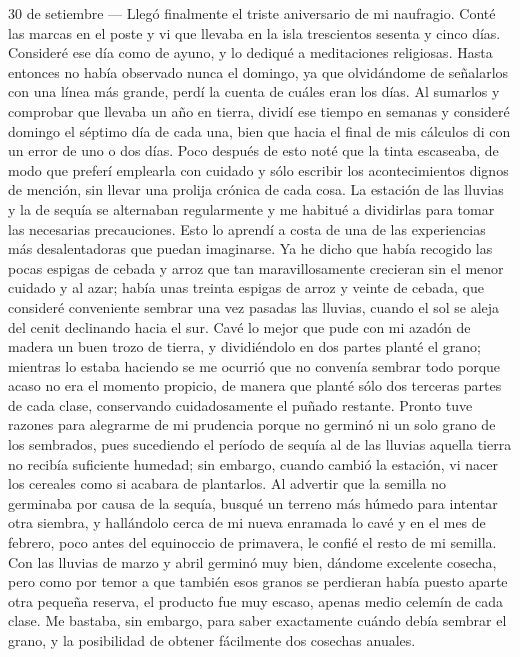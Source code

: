 \documentclass{novela}
\begin{document}
    30 de setiembre — Llegó finalmente el triste aniversario de mi naufragio. Conté las marcas en el poste y vi que llevaba en la isla trescientos sesenta y cinco días. Consideré ese día como de ayuno, y lo dediqué a meditaciones religiosas.
    Hasta entonces no había observado nunca el domingo, ya que olvidándome de señalarlos con una línea más grande, perdí la cuenta de cuáles eran los días.
    Al sumarlos y comprobar que llevaba un año en tierra, dividí ese tiempo en semanas y consideré domingo el séptimo día de cada una, bien que hacia el final de mis cálculos di con un error de uno o dos días.
    Poco después de esto noté que la tinta escaseaba, de modo que preferí emplearla con cuidado y sólo escribir los acontecimientos dignos de mención, sin llevar una prolija crónica de cada cosa.
    La estación de las lluvias y la de sequía se alternaban regularmente y me habitué a dividirlas para tomar las necesarias precauciones.
    Esto lo aprendí a costa de una de las experiencias más desalentadoras que puedan imaginarse. Ya he dicho que había recogido las pocas espigas de cebada y arroz que tan maravillosamente crecieran sin el menor cuidado y al azar; había unas treinta espigas de arroz y veinte de cebada, que consideré conveniente sembrar una vez pasadas las lluvias, cuando el sol se aleja del cenit declinando hacia el sur.
    Cavé lo mejor que pude con mi azadón de madera un buen trozo de tierra, y dividiéndolo en dos partes planté el grano; mientras lo estaba haciendo se me ocurrió que no convenía sembrar todo porque acaso no era el momento propicio, de manera que planté sólo dos terceras partes de cada clase, conservando cuidadosamente el puñado restante.
    Pronto tuve razones para alegrarme de mi prudencia porque no germinó ni un solo grano de los sembrados, pues sucediendo el período de sequía al de las lluvias aquella tierra no recibía suficiente humedad; sin embargo, cuando cambió la estación, vi nacer los cereales como si acabara de plantarlos.
    Al advertir que la semilla no germinaba por causa de la sequía, busqué un terreno más húmedo para intentar otra siembra, y hallándolo cerca de mi nueva enramada lo cavé y en el mes de febrero, poco antes del equinoccio de primavera, le confié el resto de mi semilla. Con las lluvias de marzo y abril germinó muy bien, dándome excelente cosecha, pero como por temor a que también esos granos se perdieran había puesto aparte otra pequeña reserva, el producto fue muy escaso, apenas medio celemín de cada clase. Me bastaba, sin embargo, para saber exactamente cuándo debía sembrar el grano, y la posibilidad de obtener fácilmente dos cosechas anuales.
\end{document}
